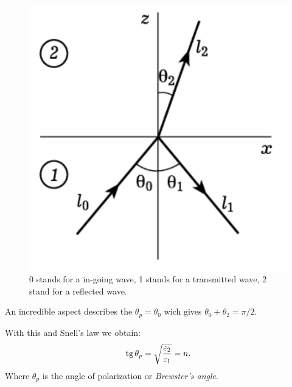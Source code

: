 \begin{minipage}{0.35\textwidth}
    \begin{figure}[h]
    \centering
    \includegraphics[width=1\textwidth]{images/brust.png}
    \caption{0 stands for a in-going wave, 1 stands for a transmitted wave, 2 stand for a reflected wave.}
\end{figure}
\end{minipage}
\hfill
\begin{minipage}{0.55\textwidth}
	 An incredible aspect describes the $\theta_p = \theta_0$ wich gives $\theta_0 + \theta_2 = \pi/2$.

	 With this and Snell's law we obtain:
	 \begin{equation}
	 	\mathop{\mathrm{tg}}\nolimits \theta_p = \sqrt{\frac{\varepsilon_2}{\varepsilon_1}} = n.
	 \end{equation}
	 Where $\theta_p$ is the angle of polarization or \textit{Brewster's angle}.
\end{minipage}

